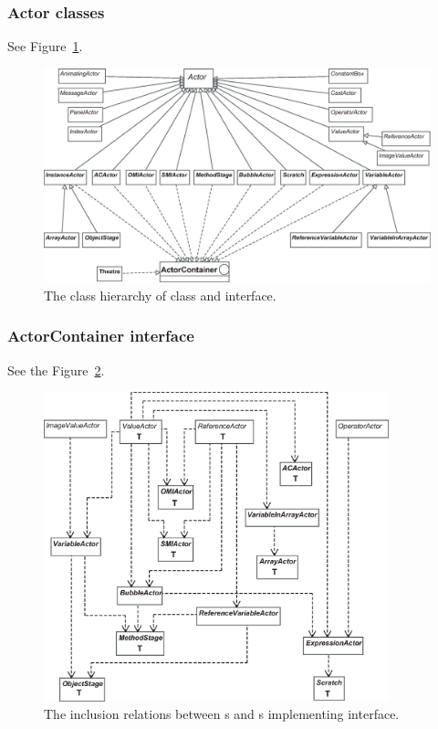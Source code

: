\subsubsection{Actor classes}
\label{sec:Actors}

See Figure~\ref{fig:class_hierarchy_of_Actor_class_small}.

\begin{figure}[!htb]
\begin{center}
\includegraphics[width=\textwidth]{images/jeliot_actor_class_small.eps}
\caption{The class hierarchy of  class and  interface.}
\label{fig:class_hierarchy_of_Actor_class_small}
\end{center}
\end{figure}

\subsubsection{ActorContainer interface}

See the Figure~\ref{fig:actors_and_actorcontainers}.

\begin{figure}[!htb]
\begin{center}
\includegraphics[width=10cm]{images/actorcontainers_and_actors.eps}
\caption{The inclusion relations between s and s implementing  interface.}
\label{fig:actors_and_actorcontainers}
\end{center}
\end{figure}

